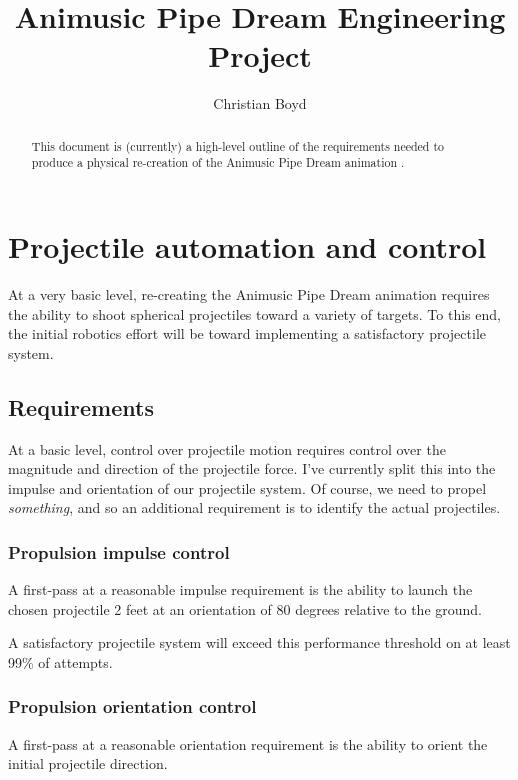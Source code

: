 \documentclass{article}
\begin{document}
\title{Animusic Pipe Dream Engineering Project}

\author{Christian Boyd}

\maketitle

\tableofcontents

\begin{abstract}
    This document is (currently) a high-level outline of the requirements needed to 
    produce a physical re-creation of the Animusic Pipe Dream animation \cite{AnimusicPipeDream}.
\end{abstract}

\section{Projectile automation and control}
At a very basic level, re-creating the Animusic Pipe Dream animation requires the ability
to shoot spherical projectiles toward a variety of targets.  To this end, the initial
robotics effort will be toward implementing a satisfactory projectile system.

\subsection{Requirements}

At a basic level, control over projectile motion requires control over the magnitude and
direction of the projectile force.  I've currently split this into the impulse and
orientation of our projectile system.  Of course, we need to propel {\it something}, and
so an additional requirement is to identify the actual projectiles.

\subsubsection{Propulsion impulse control}
A first-pass at a reasonable impulse requirement is the ability to launch the chosen
projectile 2 feet at an orientation of 80 degrees relative to the ground.

A satisfactory projectile system will exceed this performance threshold on at least 99\% of attempts.

\subsubsection{Propulsion orientation control}
A first-pass at a reasonable orientation requirement is the ability to orient the initial
projectile direction.
\end{document}
